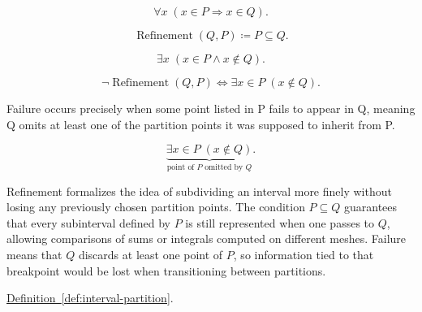 \begin{remark*}
\[
\forall x\;(x\in P \Rightarrow x\in Q).
\]
\end{remark*}

\begin{remark*}
\[
\operatorname{Refinement}(Q,P) \coloneqq P \subseteq Q.
\]
\end{remark*}

\begin{remark*}
\[
\exists x\;(x\in P \land x\notin Q).
\]
\end{remark*}

\begin{remark*}
\[
\neg \operatorname{Refinement}(Q,P) \Longleftrightarrow \exists x \in P\; (x \notin Q).
\]
\end{remark*}

\begin{remark*}
Failure occurs precisely when some point listed in P fails to appear in Q, meaning Q omits at least one of the partition points it was supposed to inherit from P.
\end{remark*}

\begin{remark*}
\[
\underbrace{\exists x \in P\; (x \notin Q)}_{\text{point of }P\text{ omitted by }Q}.
\]
\end{remark*}

\begin{remark*}[Interpretation]
Refinement formalizes the idea of subdividing an interval more finely without losing any previously chosen partition points. The condition $P \subseteq Q$ guarantees that every subinterval defined by $P$ is still represented when one passes to $Q$, allowing comparisons of sums or integrals computed on different meshes. Failure means that $Q$ discards at least one point of $P$, so information tied to that breakpoint would be lost when transitioning between partitions.
\end{remark*}

\begin{dependencies}
\hyperref[def:interval-partition]{Definition~\ref*{def:interval-partition}}.
\end{dependencies}




